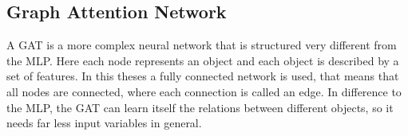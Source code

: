 

\subsection{Graph Attention Network}
\label{sec:funcgat}

A GAT is a more complex neural network that is structured very different from the MLP. Here each node represents an object and each object is described by a set of features. 
In this theses a fully connected network is used, that means that all nodes are connected, where each connection is called an edge.
In difference to the MLP, the GAT can learn itself the relations between different objects, so it needs far less input variables in general. \\

